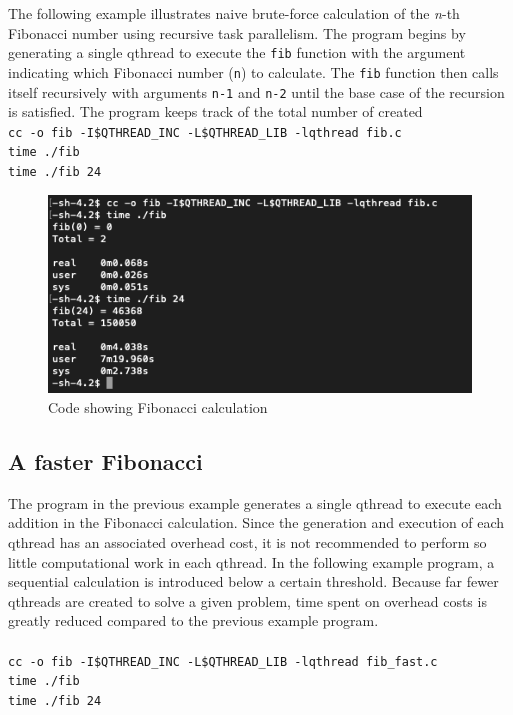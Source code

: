 \documentclass[12pt,fullpage]{article}
\begin{document}
The following example illustrates naive brute-force calculation of the {\it n}-th Fibonacci number using recursive task parallelism. The program begins by generating a single qthread to execute the {\tt fib} function with the argument indicating which Fibonacci number ({\tt n}) to calculate.  The {\tt fib} function then calls itself recursively with arguments {\tt n-1} and {\tt n-2} until the base case of the recursion is satisfied. The program keeps track of the total number of created
\\
{\footnotesize{\tt cc -o fib -I\$QTHREAD\_INC -L\$QTHREAD\_LIB -lqthread fib.c}}
\\
{\footnotesize{\tt time ./fib}}
\\
{\footnotesize{\tt time ./fib 24}}

\begin{figure}[h]
\includegraphics[scale=0.96]{fib.png}
\caption{Code showing Fibonacci calculation}
\end{figure}

\subsection{A faster Fibonacci}
The program in the previous example generates a single qthread to execute each addition in the Fibonacci calculation.  Since the generation and execution of each qthread has an associated overhead cost, it is not recommended to perform so little computational work in each qthread.  In the following example program, a sequential calculation is introduced below a certain threshold. Because far fewer qthreads are created to solve a given problem, time spent on overhead costs is greatly reduced compared to the previous example program.
\\  \\
{\footnotesize{\tt cc -o fib -I\$QTHREAD\_INC -L\$QTHREAD\_LIB -lqthread fib\_fast.c}}
\\
{\footnotesize{\tt time ./fib}}
\\
{\footnotesize{\tt time ./fib 24}}
\end{document}
